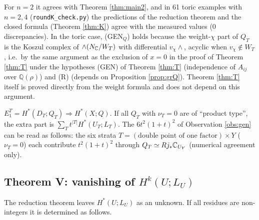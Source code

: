 \tV For $n=2$ it agrees with Theorem \ref{thm:main2}, and in 61 toric examples with $n=2,4$ (\texttt{roundK\_check.py}) the predictions of the reduction theorem and the closed formula (Theorem \ref{thm:K}) agree with the measured values (0 discrepancies). In the toric case, (GEN$_Q$) holds because the weight-$\chi$ part of $Q_T$ is the Koszul complex of $\wedge(N_\mathbb C/W_T)$ with differential $v_\chi\wedge$, acyclic when $v_\chi\notin W_T$, i.e.\ by the same argument as the exclusion of $x=0$ in the proof of Theorem \ref{thm:T} under the hypotheses (GEN) of Theorem \ref{thm:T} (independence of $A_{ij}$ over $\mathbb Q(\rho)$) and (R) \tP \tQ (depends on Proposition \ref{prop:grQ}). Theorem \ref{thm:T} itself is proved directly from the weight formula and does not depend on this argument.

\begin{conj}\tK\label{conj:nonacyc}
$E_1^T=H^*(D_T;Q_T)\Rightarrow H^*(X;Q)$. If all $Q_T$ with $\nu_T=0$ are of ``product type'', the extra part is $\sum_Tt^{|T|}H^*(U_T;L_T)$. The $6t^2(1+t)^2$ of Observation \ref{obs:gen} can be read as follows: the six strata $T=(\text{double point of one factor})\times Y$ ($\nu_T=0$) each contribute $t^2(1+t)^2$ through $Q_T\simeq Rj_*\mathbb C_{U_Y}$ (\tV numerical agreement only).
\end{conj}

\subsection{Theorem V: vanishing of $H^k(U;L_U)$}
The reduction theorem leaves $H^*(U;L_U)$ as an unknown. If all residues are non-integers it is determined as follows.

